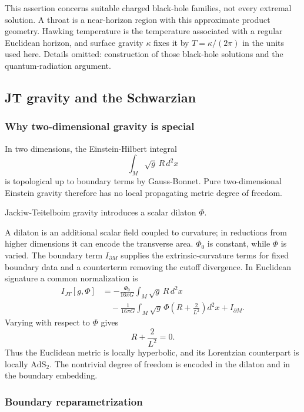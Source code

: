 \documentclass[11pt]{article}
\numberwithin{equation}{section}
\theoremstyle{exposition}
\theoremstyle{result}
\newcommand{\AdS}{\mathrm{AdS}}
\begin{document}
This assertion concerns suitable charged black-hole families, not every extremal solution. A throat is a near-horizon region with this approximate product geometry. Hawking temperature is the temperature associated with a regular Euclidean horizon, and surface gravity $\kappa$ fixes it by $T=\kappa/(2\pi)$ in the units used here. Details omitted: construction of those black-hole solutions and the quantum-radiation argument.

\subsection{JT gravity and the Schwarzian}

\subsubsection{Why two-dimensional gravity is special}

In two dimensions, the Einstein-Hilbert integral
\begin{equation*}
\int_M\sqrt g\,R\,d^2x
\end{equation*}
is topological up to boundary terms by Gauss-Bonnet. Pure two-dimensional Einstein gravity therefore has no local propagating metric degree of freedom.

Jackiw-Teitelboim gravity introduces a scalar dilaton $\Phi$.

A dilaton is an additional scalar field coupled to curvature; in reductions from higher dimensions it can encode the transverse area. $\Phi_0$ is constant, while $\Phi$ is varied. The boundary term $I_{\partial M}$ supplies the extrinsic-curvature terms for fixed boundary data and a counterterm removing the cutoff divergence. In Euclidean signature a common normalization is
\begin{align}
I_{JT}[g,\Phi]
&=-\frac{\Phi_0}{16\pi G}\int_M\sqrt g\,R\,d^2x\\
&\quad
-\frac1{16\pi G}\int_M\sqrt g\,\Phi\left(R+\frac2{L^2}\right)d^2x
+I_{\partial M}.
\label{eq:JT}
\end{align}
Varying with respect to $\Phi$ gives
\begin{equation*}
R+\frac2{L^2}=0.
\end{equation*}
Thus the Euclidean metric is locally hyperbolic, and its Lorentzian counterpart is locally $\AdS_2$. The nontrivial degree of freedom is encoded in the dilaton and in the boundary embedding.

\subsubsection{Boundary reparametrization}
\end{document}
